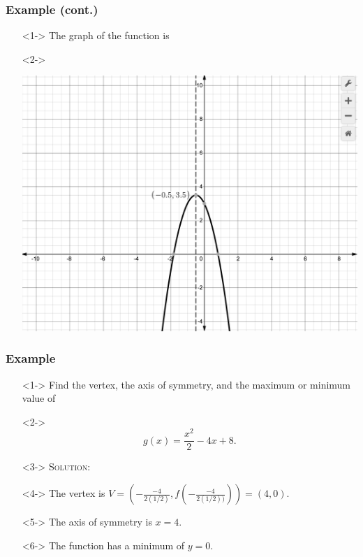 \documentclass[handout]{beamer}
\begin{document}
\begin{frame}
	\frametitle{Example (cont.)} 
	\begin{enumerate}
		\item[]<1-> The graph of the function is 
		\item[]<2->\begin{center}
				\includegraphics[scale=0.25]{3_3_3.png} 		
			\end{center} 
	\end{enumerate}
\end{frame}

\begin{frame}
	\frametitle{Example} 
	\begin{enumerate}
		\item[]<1-> Find the vertex, the axis of symmetry, and the maximum or minimum value of 
		\item[]<2->\[ g(x)=\frac{x^{2}}{2}-4x+8. \] 
		\item[]<3-> \textsc{Solution:} 
		\item[]<4-> The vertex is $V=\left( -\frac{-4}{2(1/2)}, f \left( -\frac{-4}{2(1/2))} \right)\right)=\left( 4, 0 \right)$. 
		\item[]<5-> The axis of symmetry is $x=4$. 
		\item[]<6-> The function has a minimum of $y=0$.  
	\end{enumerate}
\end{frame}
\end{document}
